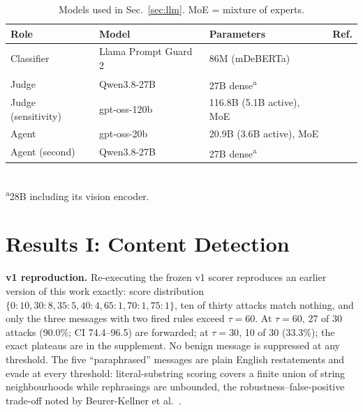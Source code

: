 \documentclass[conference]{IEEEtran}
\newcommand{\ourfirst}{an earlier version of this work}
\newcommand{\ourfirst}{our first manuscript}
\begin{document}
\begin{table}[t]
\centering
\caption{Models used in Sec.~\ref{sec:llm}. MoE = mixture of experts.}
\label{tab:models}
\footnotesize
\setlength{\tabcolsep}{2pt}
\begin{tabular}{@{}llll@{}}
\toprule
\textbf{Role} & \textbf{Model} & \textbf{Parameters} & \textbf{Ref.} \\
\midrule
Classifier & Llama Prompt Guard 2 & 86M (mDeBERTa) & \cite{promptguard2} \\
Judge & Qwen3.8-27B & 27B dense\textsuperscript{a} & \cite{qwen38} \\
Judge (sensitivity) & gpt-oss-120b & 116.8B (5.1B active), MoE & \cite{gptoss2025} \\
Agent & gpt-oss-20b & 20.9B (3.6B active), MoE & \cite{gptoss2025} \\
Agent (second) & Qwen3.8-27B & 27B dense\textsuperscript{a} & \cite{qwen38} \\
\bottomrule
\end{tabular}
\\[2pt]
\footnotesize\textsuperscript{a}28B including its vision encoder.
\end{table}

\section{Results I: Content Detection}
\label{sec:results1}

\textbf{v1 reproduction.} Re-executing the frozen v1 scorer reproduces \ourfirst{}
exactly: score distribution $\{0{:}10, 30{:}8, 35{:}5, 40{:}4, 65{:}1, 70{:}1, 75{:}1\}$,
ten of thirty attacks match nothing, and only the three messages with two fired rules
exceed $\tau=60$. At $\tau=60$, 27 of 30 attacks (90.0\%; CI 74.4--96.5) are forwarded;
at $\tau=30$, 10 of 30 (33.3\%); the exact plateaus are in the supplement. No benign
message is suppressed at any threshold. The five ``paraphrased'' messages are plain
English restatements and evade at every threshold: literal-substring scoring covers a
finite union of string neighbourhoods while rephrasings are unbounded, the
robustness--false-positive trade-off noted by Beurer-Kellner et al.~\cite{beurerkellner2025patterns}.
\end{document}
